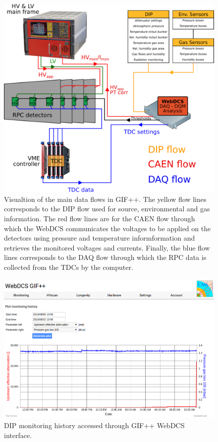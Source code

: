	\begin{figure}[H]
        \centering
		\includegraphics[width = \plotwidth]{fig/chapt5/GIFpp-setup.pdf}
		\caption{\label{fig:dataflow} Visualtion of the main data flows in GIF++. The yellow flow lines corresponds to the DIP flow used for source, environmental and gas information. The red flow lines are for the CAEN flow through which the WebDCS communicates the voltages to be applied on the detectors using pressure and temperature informformation and retrieves the monitored voltages and currents. Finally, the blue flow lines corresponds to the DAQ flow through which the RPC data is collected from the TDCs by the computer.}
	\end{figure}

	\begin{figure}[H]
        \centering
		\includegraphics[width = \plotwidth]{fig/chapt5/DIP_monitoring_history.png}
		\caption{\label{fig:DIP-monitoring} DIP monitoring history accessed through GIF++ WebDCS interface.}
	\end{figure}
	
